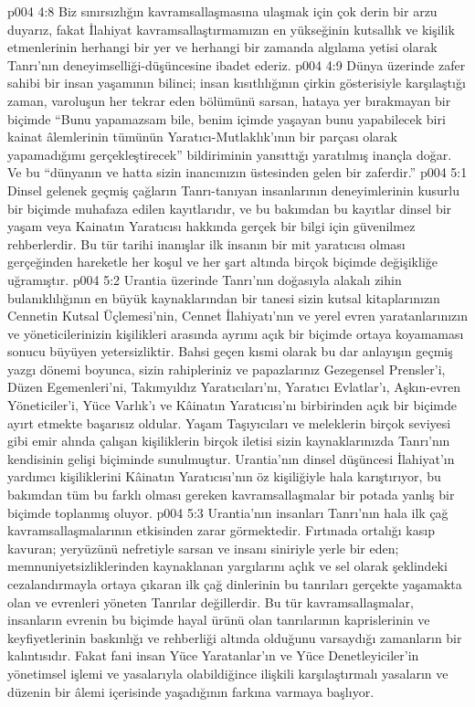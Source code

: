 \vs p004 4:8 Biz sınırsızlığın kavramsallaşmasına ulaşmak için çok derin bir arzu duyarız, fakat İlahiyat kavramsallaştırmamızın en yükseğinin kutsallık ve kişilik etmenlerinin herhangi bir yer ve herhangi bir zamanda algılama yetisi olarak Tanrı’nın deneyimselliği\hyp{}düşüncesine ibadet ederiz.
\vs p004 4:9 Dünya üzerinde zafer sahibi bir insan yaşamının bilinci; insan kısıtlılığının çirkin gösterisiyle karşılaştığı zaman, varoluşun her tekrar eden bölümünü sarsan, hataya yer bırakmayan bir biçimde “Bunu yapamazsam bile, benim içimde yaşayan bunu yapabilecek biri kainat âlemlerinin tümünün Yaratıcı\hyp{}Mutlaklık’ının bir parçası olarak yapamadığımı gerçekleştirecek” bildiriminin yansıttığı yaratılmış inançla doğar. Ve bu “dünyanın ve hatta sizin inancınızın üstesinden gelen bir zaferdir.”
\vs p004 5:1 Dinsel gelenek geçmiş çağların Tanrı\hyp{}tanıyan insanlarının deneyimlerinin kusurlu bir biçimde muhafaza edilen kayıtlarıdır, ve bu bakımdan bu kayıtlar dinsel bir yaşam veya Kainatın Yaratıcısı hakkında gerçek bir bilgi için güvenilmez rehberlerdir. Bu tür tarihi inanışlar ilk insanın bir mit yaratıcısı olması gerçeğinden hareketle her koşul ve her şart altında birçok biçimde değişikliğe uğramıştır.
\vs p004 5:2 Urantia üzerinde Tanrı’nın doğasıyla alakalı zihin bulanıklılığının en büyük kaynaklarından bir tanesi sizin kutsal kitaplarınızın Cennetin Kutsal Üçlemesi’nin, Cennet İlahiyatı’nın ve yerel evren yaratanlarınızın ve yöneticilerinizin kişilikleri arasında ayrımı açık bir biçimde ortaya koyamaması sonucu büyüyen yetersizliktir. Bahsi geçen kısmi olarak bu dar anlayışın geçmiş yazgı dönemi boyunca, sizin rahipleriniz ve papazlarınız Gezegensel Prensler’i, Düzen Egemenleri’ni, Takımyıldız Yaratıcıları’nı, Yaratıcı Evlatlar’ı, Aşkın\hyp{}evren Yöneticiler’i, Yüce Varlık’ı ve Kâinatın Yaratıcısı’nı birbirinden açık bir biçimde ayırt etmekte başarısız oldular. Yaşam Taşıyıcıları ve meleklerin birçok seviyesi gibi emir alında çalışan kişiliklerin birçok iletisi sizin kaynaklarınızda Tanrı’nın kendisinin gelişi biçiminde sunulmuştur. Urantia’nın dinsel düşüncesi İlahiyat’ın yardımcı kişiliklerini Kâinatın Yaratıcısı’nın öz kişiliğiyle hala karıştırıyor, bu bakımdan tüm bu farklı olması gereken kavramsallaşmalar bir potada yanlış bir biçimde toplanmış oluyor.
\vs p004 5:3 Urantia’nın insanları Tanrı’nın hala ilk çağ kavramsallaşmalarının etkisinden zarar görmektedir. Fırtınada ortalığı kasıp kavuran; yeryüzünü nefretiyle sarsan ve insanı siniriyle yerle bir eden; memnuniyetsizliklerinden kaynaklanan yargılarını açlık ve sel olarak şeklindeki cezalandırmayla ortaya çıkaran ilk çağ dinlerinin bu tanrıları gerçekte yaşamakta olan ve evrenleri yöneten Tanrılar değillerdir. Bu tür kavramsallaşmalar, insanların evrenin bu biçimde hayal ürünü olan tanrılarının kaprislerinin ve keyfiyetlerinin baskınlığı ve rehberliği altında olduğunu varsaydığı zamanların bir kalıntısıdır. Fakat fani insan Yüce Yaratanlar’ın ve Yüce Denetleyiciler’in yönetimsel işlemi ve yasalarıyla olabildiğince ilişkili karşılaştırmalı yasaların ve düzenin bir âlemi içerisinde yaşadığının farkına varmaya başlıyor.

